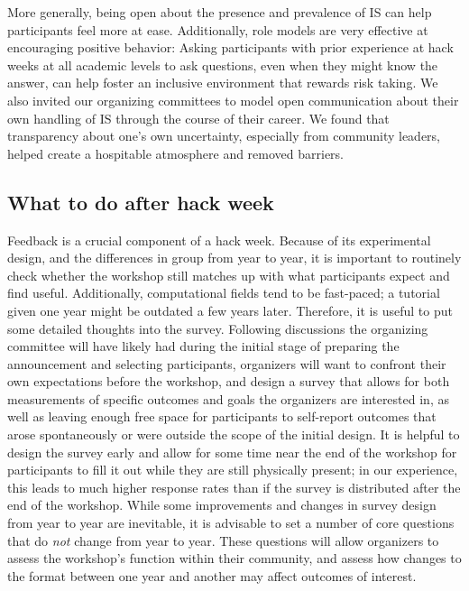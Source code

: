 \documentclass{aastex62}
\begin{document}
More generally, being open about the presence and prevalence of IS can help participants feel more at ease. %
Additionally, role models are very effective at encouraging positive behavior: Asking participants with prior experience at hack weeks at all academic levels to ask questions, even when they might know the answer, can help foster an inclusive environment that rewards risk taking. We also invited our organizing committees to model open communication about their own handling of IS through the course of their career. We found that transparency about one's own uncertainty, especially from community leaders, helped create a hospitable atmosphere and removed barriers.


\subsection{What to do after hack week}

Feedback is a crucial component of a hack week. Because of its experimental design, and the differences in group from year to year, it is important to routinely check whether the workshop still matches up with what participants expect and find useful. Additionally, computational fields tend to be fast-paced; a tutorial given one year might be outdated a few years later. Therefore, it is useful to put some detailed thoughts into the survey. Following discussions the organizing committee will have likely had during the initial stage of preparing the announcement and selecting participants, organizers will want to confront their own expectations before the workshop, and design a survey that allows for both measurements of specific outcomes and goals the organizers are interested in, as well as leaving enough free space for participants to self-report outcomes that arose spontaneously or were outside the scope of the initial design. It is helpful to design the survey early and allow for some time near the end of the workshop for participants to fill it out while they are still physically present; in our experience, this leads to much higher response rates than if the survey is distributed after the end of the workshop. While some improvements and changes in survey design from year to year are inevitable, it is advisable to set a number of core questions that do \textit{not} change from year to year. These questions will allow organizers to assess the workshop's function within their community, and assess how changes to the format between one year and another may affect outcomes of interest.
\end{document}
